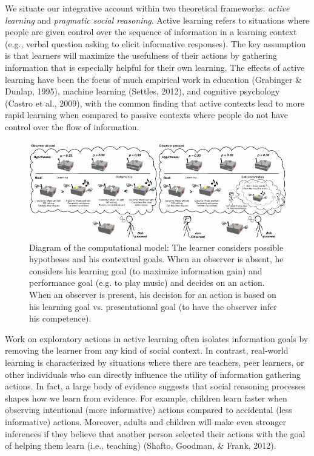 \documentclass[10pt, letterpaper]{article}
\newenvironment{CodeChunk}{}{}
\begin{document}
We situate our integrative account within two theoretical frameworks:
\emph{active learning} and \emph{pragmatic social reasoning}. Active
learning refers to situations where people are given control over the
sequence of information in a learning context (e.g., verbal question
asking to elicit informative responses). The key assumption is that
learners will maximize the usefulness of their actions by gathering
information that is especially helpful for their own learning. The
effects of active learning have been the focus of much empirical work in
education (Grabinger \& Dunlap, 1995), machine learning (Settles, 2012),
and cognitive psychology (Castro et al., 2009), with the common finding
that active contexts lead to more rapid learning when compared to
passive contexts where people do not have control over the flow of
information.

\begin{CodeChunk}
\begin{figure}[tb]

{\centering \includegraphics[width=0.95\linewidth]{figs/model_diagram-1} 

}

\caption[Diagram of the computational model]{Diagram of the computational model: The learner considers possible hypotheses and his contextual goals. When an observer is absent, he considers his learning goal (to maximize information gain) and performance goal (e.g. to play music) and decides on an action. When an observer is present, his decision for an action is based on his learning goal vs. presentational goal (to have the observer infer his competence).}\label{fig:model_diagram}
\end{figure}
\end{CodeChunk}

Work on exploratory actions in active learning often isolates
information goals by removing the learner from any kind of social
context. In contrast, real-world learning is characterized by situations
where there are teachers, peer learners, or other individuals who can
directly influence the utility of information gathering actions. In
fact, a large body of evidence suggests that social reasoning processes
shapes how we learn from evidence. For example, children learn faster
when observing intentional (more informative) actions compared to
accidental (less informative) actions. Moreover, adults and children
will make even stronger inferences if they believe that another person
selected their actions with the goal of helping them learn (i.e.,
teaching) (Shafto, Goodman, \& Frank, 2012).
\end{document}
